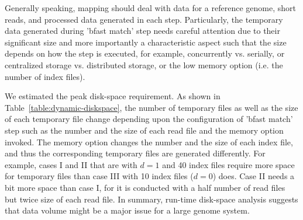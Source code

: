 \documentclass{cpeauth}
\begin{document}



Generally speaking, mapping should deal with data for a
reference genome, short reads, and processed data generated in each
step.  Particularly, the temporary data generated during 'bfast match'
step needs careful attention due to their significant size and more
importantly a characteristic aspect such that the size depends on how
the step is executed, for example, concurrently vs. serially, or
centralized storage vs. distributed storage, or the low memory option
(i.e. the number of index files).

We estimated the peak disk-space requirement.  As shown in
Table~\ref{table:dynamic-diskspace}, the number of temporary files as
well as the size of each temporary file change depending upon the
configuration of 'bfast match' step such as the number and the size of
each read file and the memory option invoked.  The memory option
changes the number and the size of each index file, and thus the
corresponding temporary files are generated differently.  For example,
cases I and II that are with $d=1$ and 40 index files require more
space for temporary files than case III with 10 index files ($d=0$)
does. Case II needs a bit more space than case I, for it is conducted
with a half number of read files but twice size of each read file.  In
summary, run-time disk-space analysis suggests that data volume might
be a major issue for a large genome system.
   

\end{document}
